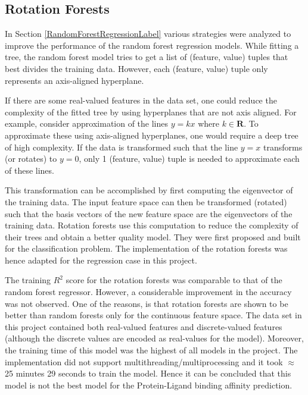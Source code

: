 \documentclass[11pt]{article}
\begin{document}
\subsection{Rotation Forests}

In Section \ref{RandomForestRegressionLabel} various strategies were analyzed to improve the performance of the random forest regression models.
While fitting a tree, the random forest model tries to get a list of (feature, value) tuples that best divides the training data.
However,  each (feature, value) tuple only represents an axis-aligned hyperplane.

If there are some real-valued features in the data set,  one could reduce the complexity of the fitted tree by using hyperplanes that are not axis aligned.
For example, consider approximation of the lines $y = kx$ where $k \in \mathbf{R}$.
To approximate these using axis-aligned hyperplanes,  one would require a deep tree of high complexity.
If the data is transformed such that the line $y = x$ transforms (or rotates) to $y = 0$,  only 1 (feature, value) tuple is needed to approximate each of these lines.

This transformation can be accomplished by first computing the eigenvector of the training data. The input feature space can then be transformed (rotated) such that the basis vectors of the new feature space are the eigenvectors of the training data.
Rotation forests use this computation to reduce the complexity of their trees and obtain a better quality model. 
They were first proposed and built for the classification problem. The implementation of the rotation forests was hence adapted for the regression case in this project.

The training $R^2$ score for the rotation forests was comparable to that of the random forest regressor.
However,  a considerable improvement in the accuracy was not observed.
One of the reasons,  is that rotation forests are shown to be better than random forests only for the continuous feature space.
The data set in this project contained both real-valued features and discrete-valued features (although the discrete values are encoded as real-values for the model).
Moreover, the training time of this model was the highest of all models in the project.
The implementation did not support multithreading/multiprocessing and it took $\approx$ 25 minutes 29 seconds to train the model.
Hence it can be concluded that this model is not the best model for the Protein-Ligand binding affinity prediction.
\end{document}
